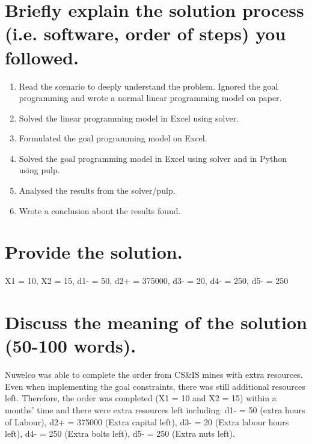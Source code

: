 \documentclass[a4paper,oneside,11pt]{book}
\begin{document}
\section{Briefly explain the solution process (i.e. software, order of steps) you followed. }
\begin{enumerate}
    \item Read the scenario to deeply understand the problem.
    Ignored the goal programming and wrote a normal linear programming model on paper.
    \item Solved the linear programming model in Excel using solver.
    \item Formulated the goal programming model on Excel.
    \item Solved the goal programming model in Excel using solver and in Python using pulp.
    \item Analysed the results from the solver/pulp.
    \item Wrote a conclusion about the results found.
\end{enumerate}
\section{Provide the solution.}
X1 = 10, X2 = 15, d1- = 50, d2+ = 375000, d3- = 20, d4- = 250, d5- = 250
\section{Discuss the meaning of the solution (50-100 words).}
Nuwelco was able to complete the order from CS\&IS mines with extra resources. Even when implementing the goal constraints, there was still additional resources left. Therefore, the order was completed (X1 = 10 and X2 = 15) within a months’ time and there were extra resources left including: d1- = 50 (extra hours of Labour), d2+ = 375000 (Extra capital left), d3- = 20 (Extra labour hours left), d4- = 250 (Extra bolts left), d5- = 250 (Extra nuts left).
\newpage
\end{document}
